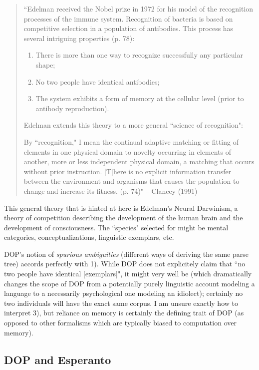 \documentclass[10pt,a4paper]{article}
\begin{document}
\begin{quote}
	``Edelman received the Nobel prize in 1972 for his model of the
	recognition processes of the immune system. Recognition of bacteria is
	based on competitive selection in a population of antibodies. This
	process has several intriguing properties (p. 78): 
	
	\begin{enumerate} %
	\item There is more than one way to recognize successfully any particular shape;
	\item No two people have identical antibodies;
	\item The system exhibits a form of memory at the cellular level (prior to
	antibody reproduction).
	\end{enumerate}

	Edelman extends this theory to a more general ``science of recognition": 

	By ``recognition," I mean the continual adaptive matching or fitting of
	elements in one physical domain to novelty occurring in elements of
	another, more or less independent physical domain, a matching that
	occurs without prior instruction. [T]here is no explicit information
	transfer between the environment and organisms that causes the
	population to change and increase its fitness. (p. 74)" 
	-- Clancey (1991)
\end{quote}

This general theory that is hinted at here is Edelman's Neural Darwinism,
a theory of competition describing the development of the human brain and
the development of consciousness. The ``species" selected for might be mental
categories, conceptualizations, linguistic exemplars, etc. 

DOP's notion of {\em spurious ambiguities} (different ways of deriving the same
parse tree) accords perfectly with 1).  While DOP does not explicitely claim
that ``no two people have identical [exemplars]", it might very well be (which
dramatically changes the scope of DOP from a potentially purely linguistic
account modeling a language to a necessarily psychological one modeling an
idiolect); certainly no two individuals will have the exact same corpus. I am
unsure exactly how to interpret 3), but reliance on memory is certainly the
defining trait of DOP (as opposed to other formalisms which are typically
biased to computation over memory).

\subsection{DOP and Esperanto}
\end{document}
